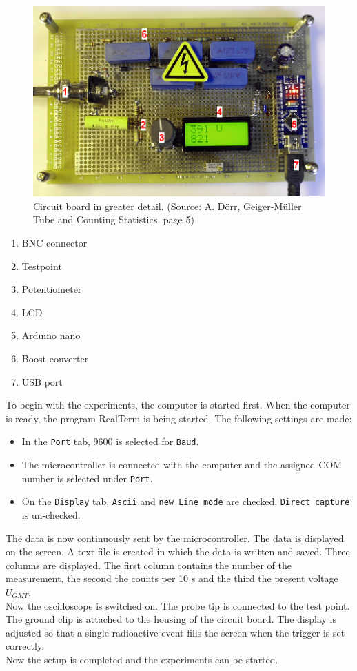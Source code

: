 \begin{figure}[H]
	\begin{center}
		\includegraphics[width=.9\textwidth]{aufbau/circuit_board.png}
		\caption{Circuit board in greater detail. (Source: A. Dörr, Geiger-Müller Tube and Counting Statistics, page 5)}  
		\label{fig:circuit_board} 
	\end{center}
\end{figure}
%
\begin{enumerate}
	\item BNC connector
	\item Testpoint
	\item Potentiometer
	\item LCD
	\item Arduino nano
	\item Boost converter
	\item USB port
\end{enumerate}
%
To begin with the experiments, the computer is started first. When the computer is ready, the program RealTerm is being started. The following settings are made:
\begin{itemize}
	\item In the \texttt{Port} tab, 9600 is selected for \texttt{Baud}.
	\item The microcontroller is connected with the computer and the assigned COM number is selected under \texttt{Port}.
	\item On the \texttt{Display} tab, \texttt{Ascii} and \texttt{new Line mode} are checked, \texttt{Direct capture} is un-checked.
\end{itemize}
%
The data is now continuously sent by the microcontroller. The data is displayed on the screen. A text file is created in which the data is written and saved. Three columns are displayed. The first column contains the number of the measurement, the second the counts per 10 s and the third the present voltage $U_{GMT}$.\\
Now the oscilloscope is switched on. The probe tip is connected to the test point. The ground clip is attached to the housing of the circuit board. The display is adjusted so that a single radioactive event fills the screen when the trigger is set correctly.\\
Now the setup is completed and the experiments can be started.